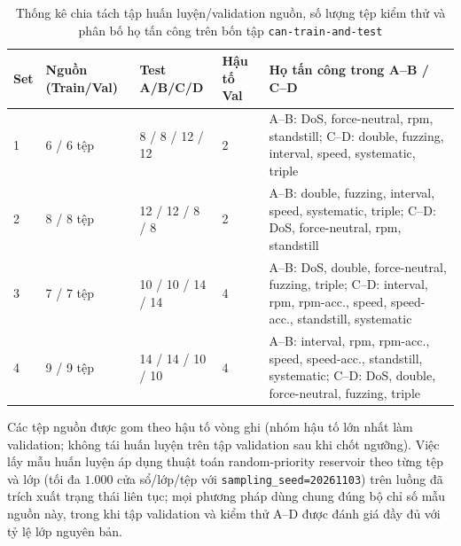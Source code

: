 \documentclass[12pt, a4paper, reqno, oneside]{book}
\DeclareRobustCommand{\code}[1]{\nolinkurl{#1}}
\begin{document}
{\renewcommand{\arraystretch}{0.88}
\begin{table}[htbp]\centering\footnotesize
\caption{Thống kê chia tách tập huấn luyện/validation nguồn, số lượng tệp kiểm thử và phân bố họ tấn công trên bốn tập \texttt{can-train-and-test}}\label{tab:split-stats}
\begin{tabular}{P{1.1cm}P{2.2cm}P{2.2cm}P{1.5cm}P{6.3cm}}
\toprule
Set & Nguồn (Train/Val) & Test A/B/C/D & Hậu tố Val & Họ tấn công trong A--B / C--D \\  & 6 / 6 tệp & 8 / 8 / 12 / 12 & 2 & A--B: DoS, force-neutral, rpm, standstill; C--D: double, fuzzing, interval, speed, systematic, triple \\
2 & 8 / 8 tệp & 12 / 12 / 8 / 8 & 2 & A--B: double, fuzzing, interval, speed, systematic, triple; C--D: DoS, force-neutral, rpm, standstill \\
3 & 7 / 7 tệp & 10 / 10 / 14 / 14 & 4 & A--B: DoS, double, force-neutral, fuzzing, triple; C--D: interval, rpm, rpm-acc., speed, speed-acc., standstill, systematic \\
4 & 9 / 9 tệp & 14 / 14 / 10 / 10 & 4 & A--B: interval, rpm, rpm-acc., speed, speed-acc., standstill, systematic; C--D: DoS, double, force-neutral, fuzzing, triple \\
\bottomrule
\end{tabular}
\end{table}}

Các tệp nguồn được gom theo hậu tố vòng ghi (nhóm hậu tố lớn nhất làm validation; không tái huấn luyện trên tập validation sau khi chốt ngưỡng). Việc lấy mẫu huấn luyện áp dụng thuật toán random-priority reservoir theo từng tệp và lớp (tối đa $1.000$ cửa sổ/lớp/tệp với \code{sampling\_seed=20261103}) trên luồng đã trích xuất trạng thái liên tục; mọi phương pháp dùng chung đúng bộ chỉ số mẫu nguồn này, trong khi tập validation và kiểm thử A--D được đánh giá đầy đủ với tỷ lệ lớp nguyên bản.
\end{document}
